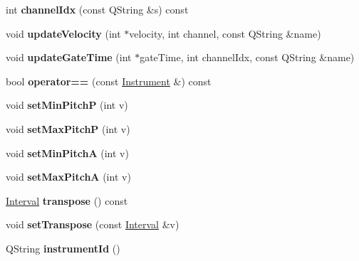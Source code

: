 \begin{DoxyCompactItemize}
int {\bfseries channel\+Idx} (const Q\+String \&s) const
\item 
\mbox{\label{class_ms_1_1_instrument_a2aebe9753c44e5080dc94f3b7fb3043e}} 
void {\bfseries update\+Velocity} (int $\ast$velocity, int channel, const Q\+String \&name)
\item 
\mbox{\label{class_ms_1_1_instrument_ad4f5fc0cc1cfa2bcea6ace19849c22ee}} 
void {\bfseries update\+Gate\+Time} (int $\ast$gate\+Time, int channel\+Idx, const Q\+String \&name)
\item 
\mbox{\label{class_ms_1_1_instrument_a0963f1462e91f210f52edf6238afa3d4}} 
bool {\bfseries operator==} (const \hyperlink{class_ms_1_1_instrument}{Instrument} \&) const
\item 
\mbox{\label{class_ms_1_1_instrument_a8b5342b40efb77e2ab3c13314d2d988d}} 
void {\bfseries set\+Min\+PitchP} (int v)
\item 
\mbox{\label{class_ms_1_1_instrument_a377c095d03aaf7ade23d413ee8b1eb41}} 
void {\bfseries set\+Max\+PitchP} (int v)
\item 
\mbox{\label{class_ms_1_1_instrument_ad0f624488e8d22d885b5b71a7128b36b}} 
void {\bfseries set\+Min\+PitchA} (int v)
\item 
\mbox{\label{class_ms_1_1_instrument_aca547d29d2726faa4f66b8807d823c75}} 
void {\bfseries set\+Max\+PitchA} (int v)
\item 
\mbox{\label{class_ms_1_1_instrument_aa79b017182d2d76a2d398a56c038b3fc}} 
\hyperlink{struct_ms_1_1_interval}{Interval} {\bfseries transpose} () const
\item 
\mbox{\label{class_ms_1_1_instrument_aebf5fe12b5d95b1fe14cc9eeded4ebeb}} 
void {\bfseries set\+Transpose} (const \hyperlink{struct_ms_1_1_interval}{Interval} \&v)
\item 
\mbox{\label{class_ms_1_1_instrument_aa4cc1131c5ee048a6e16897cbb7c2a13}} 
Q\+String {\bfseries instrument\+Id} ()

\end{DoxyCompactItemize}
